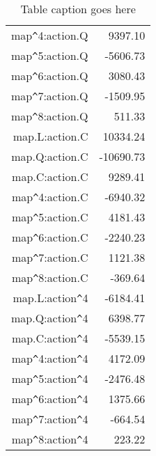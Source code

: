 \documentclass[10pt,a4paper]{article}
\begin{document}
\begin{table}[ht]
\begin{tabular}{rr}
  map\verb|^|4:action.Q & 9397.10 \\ 
  map\verb|^|5:action.Q & -5606.73 \\ 
  map\verb|^|6:action.Q & 3080.43 \\ 
  map\verb|^|7:action.Q & -1509.95 \\ 
  map\verb|^|8:action.Q & 511.33 \\ 
  map.L:action.C & 10334.24 \\ 
  map.Q:action.C & -10690.73 \\ 
  map.C:action.C & 9289.41 \\ 
  map\verb|^|4:action.C & -6940.32 \\ 
  map\verb|^|5:action.C & 4181.43 \\ 
  map\verb|^|6:action.C & -2240.23 \\ 
  map\verb|^|7:action.C & 1121.38 \\ 
  map\verb|^|8:action.C & -369.64 \\ 
  map.L:action\verb|^|4 & -6184.41 \\ 
  map.Q:action\verb|^|4 & 6398.77 \\ 
  map.C:action\verb|^|4 & -5539.15 \\ 
  map\verb|^|4:action\verb|^|4 & 4172.09 \\ 
  map\verb|^|5:action\verb|^|4 & -2476.48 \\ 
  map\verb|^|6:action\verb|^|4 & 1375.66 \\ 
  map\verb|^|7:action\verb|^|4 & -664.54 \\ 
  map\verb|^|8:action\verb|^|4 & 223.22 \\ 
   \hline
\end{tabular}
\caption{Table caption goes here}
\label{table:4}
\end{table}
\end{document}
